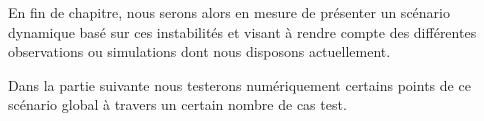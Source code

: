	En fin de chapitre, nous serons alors en mesure de présenter un scénario dynamique basé sur ces instabilités et visant à rendre compte des
	différentes observations ou simulations dont nous disposons actuellement.

	Dans la partie suivante nous testerons numériquement certains points de ce scénario global à travers un certain nombre de cas test.

	
	
	

